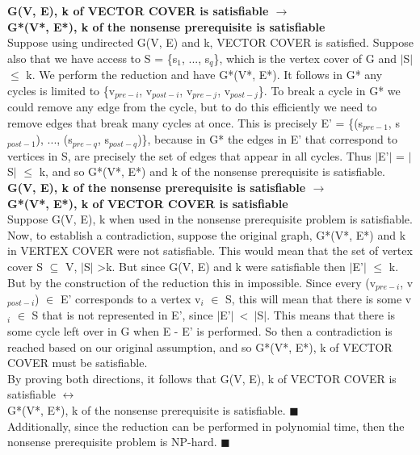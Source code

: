 \documentclass[10pt]{csc_assignment}
\begin{document}
\begin{description}
\textbf{G(V, E), k of VECTOR COVER is satisfiable $\rightarrow$ \\G*(V*, E*), k of the nonsense prerequisite is satisfiable}\\
Suppose using undirected G(V, E) and k, VECTOR COVER is satisfied. Suppose also that we have access to S = \{s$_{1}$, ..., s$_{q}$\}, which is the vertex cover of G and $\mid$S$\mid$ $\leqslant$ k. We perform the reduction and have G*(V*, E*). It follows in G* any cycles is limited to \{v$_{pre-i}$, v$_{post-i}$, v$_{pre-j}$, v$_{post-j}$\}. To break a cycle in G* we could remove any edge from the cycle, but to do this efficiently we need to remove edges that break many cycles at once. This is precisely E' = \{(s$_{pre-1}$, s$_{post-1}$), ..., (s$_{pre-q}$, s$_{post-q}$)\}, because in G* the edges in E' that correspond to vertices in S, are precisely the set of edges that appear in all cycles. Thus $\mid$E'$\mid$ = $\mid$S$\mid$ $\leqslant$ k, and so G*(V*, E*) and k of the nonsense prerequisite is satisfiable.\\ 
\textbf{G(V, E), k of the nonsense prerequisite is satisfiable $\rightarrow$\\ G*(V*, E*), k of VECTOR COVER is satisfiable}\\
Suppose G(V, E), k when used in the nonsense prerequisite problem is satisfiable. Now, to establish a contradiction, suppose the original graph, G*(V*, E*) and k in VERTEX COVER were not satisfiable. This would mean that the set of vertex cover S $\subseteq$ V, $\mid$S$\mid$ \textgreater k. But since G(V, E) and k were satisfiable then $\mid$E'$\mid$ $\leqslant$ k. But by the construction of the reduction this in impossible. Since every (v$_{pre-i}$, v$_{post-i}$) $\in$ E' corresponds to a vertex v$_{i}$ $\in$ S, this will mean that there is some v$_{i}$ $\in$ S that is not represented in E', since \mbox{$\mid$E'$\mid$ \textless ~$\mid$S$\mid$}. This means that there is some cycle left over in G when E - E' is performed. So then a contradiction is reached based on our original assumption, and so G*(V*, E*), k of VECTOR COVER must be satisfiable.\\

By proving both directions, it follows that G(V, E), k of VECTOR COVER is satisfiable $\leftrightarrow$ \\G*(V*, E*), k of the nonsense prerequisite is satisfiable. $\blacksquare$\\

Additionally, since the reduction can be performed in polynomial time, then the nonsense prerequisite problem is NP-hard. $\blacksquare$


\end{description}
\end{document}

